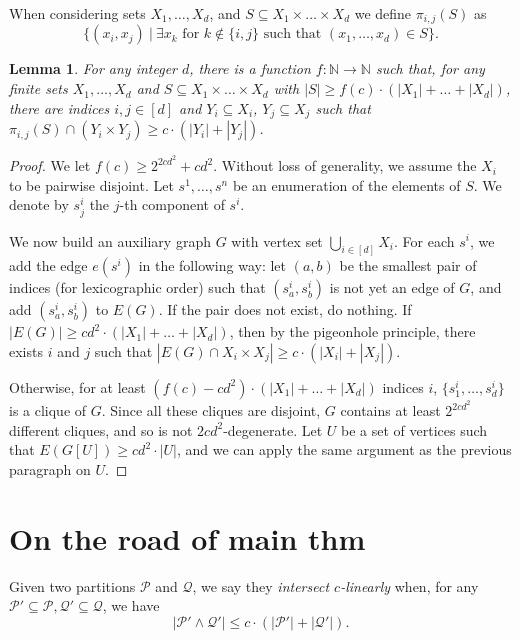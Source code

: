 \documentclass[11pt]{article}
\newtheorem{lemma}{Lemma}
\theoremstyle{definition}
\newcommand{\QQ}{{\mathcal Q}}
\newcommand{\PP}{{\mathcal P}}
\newcommand{\N}{\mathbb{N}}
\newcommand{\inducedSS}[2]{#1/#2}%
\renewcommand{\le}{\leqslant}
\renewcommand{\ge}{\geqslant}
\renewcommand{\subset}{\subseteq}
\newcommand{\remph}[1]{{\color{red} \emph{#1}}}
\begin{document}
When considering sets $X_1, \dots, X_d$, and $S \subseteq X_1 \times \dots \times X_d$ we define $\pi_{i, j}(S)$ as
\[
\{(x_i, x_j)~|~\exists x_k \text{ for } k \not \in \{i, j\} \text{ such that } (x_1, \dots, x_d) \in S\}.
\]
\begin{lemma}\label{lem:projection}
For any integer $d$, there is a function $f : \N \to \N$ such that, for any finite sets $X_1, \dots, X_d$ and $S \subseteq X_1 \times \dots \times X_d$ with $|S| \ge f(c) \cdot (|X_1| + \dots + |X_d|)$,
there are indices $i, j \in [d]$ and $Y_i \subset X_i$, $Y_j \subset X_j$ such that $\pi_{i, j}(S) \cap (Y_i \times Y_j) \ge c \cdot (|Y_i| + |Y_j|)$.
\end{lemma}
\begin{proof}
  We let $f(c) \ge 2^{2c d^2} + c d^2$.
  Without loss of generality, we assume the $X_i$ to be pairwise disjoint.
  Let $s^1, \dots, s^n$ be an enumeration of the elements of $S$.
  We denote by $s^i_j$ the $j$-th component of $s^i$.

  We now build an auxiliary graph $G$ with vertex set $\bigcup_{i \in [d]} X_i$.
  For each $s^i$, we add the edge $e(s^i)$ in the following way: let $(a, b)$ be the smallest pair of indices (for lexicographic order) such that $(s^i_a, s^i_b)$ is not yet an edge of $G$, and add $(s^i_a, s^i_b)$ to $E(G)$. If the pair does not exist, do nothing.
  If $|E(G)| \ge c d^2 \cdot (|X_1| + \dots + |X_d|)$, then by the pigeonhole principle, there exists $i$ and $j$ such that $|E(G) \cap X_i \times X_j| \ge c \cdot (|X_i| + |X_j|)$.

  Otherwise, for at least  $(f(c) - c d^2) \cdot (|X_1| + \dots + |X_d|)$ indices $i$, $\{s^i_1, \dots, s^i_d\}$ is a clique of $G$. Since all these cliques are disjoint, $G$ contains at least $2^{2c d^2}$ different cliques, and so is not $2c d^2$-degenerate.
  Let $U$ be a set of vertices such that $E(G[U]) \ge c d^2 \cdot |U|$, and we can apply the same argument as the previous paragraph on $U$. 
\end{proof}


\section{On the road of main thm}
\newcommand{\twins}[2]{\text{twins}(\inducedSS{#1}{#2})}

Given two partitions $\PP$ and $\QQ$, we say they \remph{intersect $c$-linearly} when, for any $\PP' \subseteq \PP, \QQ' \subseteq \QQ$, we have 
\[
|\PP' \wedge \QQ'| \le c \cdot (|\PP'| + |\QQ'|).
\]
\end{document}
